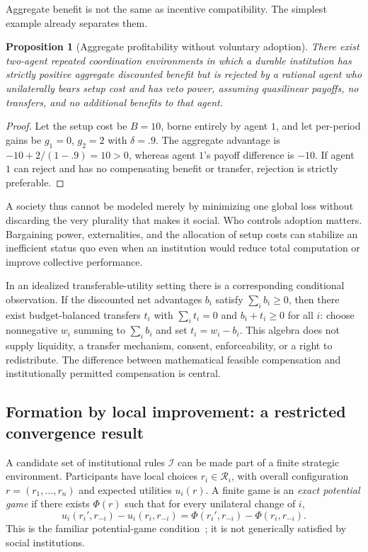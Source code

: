 \documentclass[11pt,letterpaper]{article}
\theoremstyle{plain}
\newtheorem{proposition}{Proposition}[section]
\theoremstyle{definition}
\theoremstyle{remark}
\begin{document}
Aggregate benefit is not the same as incentive compatibility. The simplest example already separates them.

\begin{proposition}[Aggregate profitability without voluntary adoption]\label{prop:veto}
There exist two-agent repeated coordination environments in which a durable institution has strictly positive aggregate discounted benefit but is rejected by a rational agent who unilaterally bears setup cost and has veto power, assuming quasilinear payoffs, no transfers, and no additional benefits to that agent.
\end{proposition}
\begin{proof}
Let the setup cost be $B=10$, borne entirely by agent $1$, and let per-period gains be $g_1=0$, $g_2=2$ with $\delta=.9$. The aggregate advantage is $-10+2/(1-.9)=10>0$, whereas agent $1$'s payoff difference is $-10$. If agent $1$ can reject and has no compensating benefit or transfer, rejection is strictly preferable.
\end{proof}

A society thus cannot be modeled merely by minimizing one global loss without discarding the very plurality that makes it social. Who controls adoption matters. Bargaining power, externalities, and the allocation of setup costs can stabilize an inefficient status quo even when an institution would reduce total computation or improve collective performance.

In an idealized transferable-utility setting there is a corresponding conditional observation. If the discounted net advantages $b_i$ satisfy $\sum_i b_i\ge0$, then there exist budget-balanced transfers $t_i$ with $\sum_i t_i=0$ and $b_i+t_i\ge0$ for all $i$: choose nonnegative $w_i$ summing to $\sum_i b_i$ and set $t_i=w_i-b_i$. This algebra does not supply liquidity, a transfer mechanism, consent, enforceability, or a right to redistribute. The difference between mathematical feasible compensation and institutionally permitted compensation is central.

\subsection{Formation by local improvement: a restricted convergence result}

A candidate set of institutional rules $\mathcal I$ can be made part of a finite strategic environment. Participants have local choices $r_i\in\mathcal R_i$, with overall configuration $r=(r_1,\ldots,r_n)$ and expected utilities $u_i(r)$. A finite game is an \emph{exact potential game} if there exists $\Phi(r)$ such that for every unilateral change of $i$,
\[
u_i(r_i',r_{-i})-u_i(r_i,r_{-i})
=\Phi(r_i',r_{-i})-\Phi(r_i,r_{-i}).
\]
This is the familiar potential-game condition~\cite{monderer}; it is not generically satisfied by social institutions.
\end{document}
